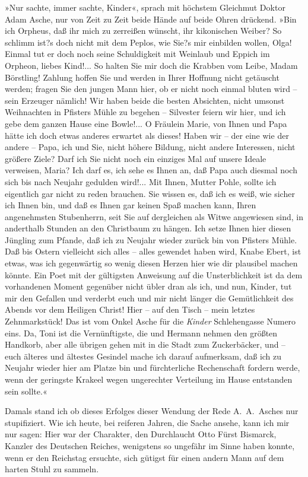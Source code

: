 »Nur sachte, immer sachte, Kinder«, sprach mit höchstem Gleichmut
Doktor Adam Asche, nur von Zeit zu Zeit beide Hände auf beide Ohren
drückend. »Bin ich Orpheus, daß ihr mich zu zerreißen wünscht, ihr
kikonischen Weiber? So schlimm ist?s doch nicht mit dem Peplos, wie
Sie?s mir einbilden wollen, Olga! Einmal tut er doch noch seine
Schuldigkeit mit Weinlaub und Eppich im Orpheon, liebes Kind!... So
halten Sie mir doch die Krabben vom Leibe, Madam Börstling! Zahlung
hoffen Sie und werden in Ihrer Hoffnung nicht getäuscht werden;
fragen Sie den jungen Mann hier, ob er nicht noch einmal bluten
wird – sein Erzeuger nämlich! Wir haben beide die besten Absichten,
nicht umsonst Weihnachten in Pfisters Mühle zu begehen – Silvester
feiern wir hier, und ich gebe dem ganzen Hause eine Bowle!... O
Fräulein Marie, von Ihnen und Papa hätte ich doch etwas anderes
erwartet als dieses! Haben wir – der eine wie der andere – Papa,
ich und Sie, nicht höhere Bildung, nicht andere Interessen, nicht
größere Ziele? Darf ich Sie nicht noch ein einziges Mal auf unsere
Ideale verweisen, Maria? Ich darf es, ich sehe es Ihnen an, daß
Papa auch diesmal noch sich bis nach Neujahr gedulden wird!... Mit
Ihnen, Mutter Pohle, sollte ich eigentlich gar nicht zu reden
brauchen. Sie wissen es, daß ich es weiß, wie sicher ich Ihnen bin,
und daß es Ihnen gar keinen Spaß machen kann, Ihren angenehmsten
Stubenherrn, seit Sie auf dergleichen als Witwe angewiesen sind, in
anderthalb Stunden an den Christbaum zu hängen. Ich setze Ihnen
hier diesen Jüngling zum Pfande, daß ich zu Neujahr wieder zurück
bin von Pfisters Mühle. Daß bis Ostern vielleicht sich alles –
alles gewendet haben wird, Knabe Ebert, ist etwas, was ich
gegenwärtig so wenig diesen Herzen hier wie dir plausibel machen
könnte. Ein Poet mit der gültigsten Anweisung auf die
Unsterblichkeit ist da dem vorhandenen Moment gegenüber nicht übler
dran als ich, und nun, Kinder, tut mir den Gefallen und verderbt
euch und mir nicht länger die Gemütlichkeit des Abends vor dem
Heiligen Christ! Hier – auf den Tisch – mein letztes Zehnmarkstück!
Das ist vom Onkel Asche für die \emph{Kinder} Schlehengasse Numero
eins. Da, Toni ist die Vernünftigste, die und Hermann nehmen den
größten Handkorb, aber alle übrigen gehen mit in die Stadt zum
Zuckerbäcker, und – euch älteres und ältestes Gesindel mache ich
darauf aufmerksam, daß ich zu Neujahr wieder hier am Platze bin und
fürchterliche Rechenschaft fordern werde, wenn der geringste
Krakeel wegen ungerechter Verteilung im Hause entstanden sein
sollte.«

Damals stand ich ob dieses Erfolges dieser Wendung der Rede
A.~A.~Asches nur stupifiziert. Wie ich heute, bei reiferen Jahren,
die Sache ansehe, kann ich mir nur sagen: Hier war der Charakter,
den Durchlaucht Otto Fürst Bismarck, Kanzler des Deutschen Reiches,
wenigstens so ungefähr im Sinne haben konnte, wenn er den Reichstag
ersuchte, sich gütigst für einen andern Mann auf dem harten Stuhl
zu sammeln.

